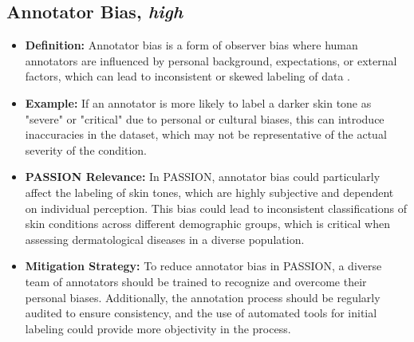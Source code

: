 \begin{refsection}
		\subsection{Annotator Bias, \textit{high}}
		\begin{itemize}
			\item \textbf{Definition:} Annotator bias is a form of observer bias where human annotators are influenced by personal background, expectations, or external factors, which can lead to inconsistent or skewed labeling of data \autocite{Montoya_2025}.
			\item \textbf{Example:} If an annotator is more likely to label a darker skin tone as "severe" or "critical" due to personal or cultural biases, this can introduce inaccuracies in the dataset, which may not be representative of the actual severity of the condition.
			\item \textbf{PASSION Relevance:} In PASSION, annotator bias could particularly affect the labeling of skin tones, which are highly subjective and dependent on individual perception. This bias could lead to inconsistent classifications of skin conditions across different demographic groups, which is critical when assessing dermatological diseases in a diverse population.
			\item \textbf{Mitigation Strategy:} To reduce annotator bias in PASSION, a diverse team of annotators should be trained to recognize and overcome their personal biases. Additionally, the annotation process should be regularly audited to ensure consistency, and the use of automated tools for initial labeling could provide more objectivity in the process.
		\end{itemize}
		

\end{refsection}

